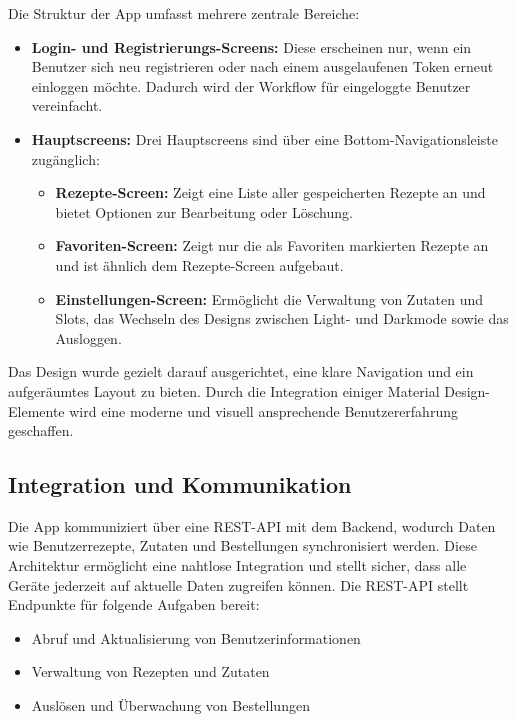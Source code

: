Die Struktur der App umfasst mehrere zentrale Bereiche:

\begin{itemize}
    \item \textbf{Login- und Registrierungs-Screens:} Diese erscheinen nur, wenn ein Benutzer sich 
        neu registrieren oder nach einem ausgelaufenen Token erneut einloggen möchte. Dadurch wird 
        der Workflow für eingeloggte Benutzer vereinfacht.
    \item \textbf{Hauptscreens:} Drei Hauptscreens sind über eine Bottom-Navigationsleiste 
        zugänglich:
    \begin{itemize}
        \item \textbf{Rezepte-Screen:} Zeigt eine Liste aller gespeicherten Rezepte an und bietet 
            Optionen zur Bearbeitung oder Löschung.
        \item \textbf{Favoriten-Screen:} Zeigt nur die als Favoriten markierten Rezepte an und ist 
            ähnlich dem Rezepte-Screen aufgebaut.
        \item \textbf{Einstellungen-Screen:} Ermöglicht die Verwaltung von Zutaten und Slots, das 
            Wechseln des Designs zwischen Light- und Darkmode sowie das Ausloggen.
    \end{itemize}
\end{itemize}

Das Design wurde gezielt darauf ausgerichtet, eine klare Navigation und ein aufgeräumtes Layout zu 
bieten. Durch die Integration einiger Material Design-Elemente wird eine moderne und visuell 
ansprechende Benutzererfahrung geschaffen.

\subsection{Integration und Kommunikation}
Die App kommuniziert über eine REST-API mit dem Backend, wodurch Daten wie Benutzerrezepte, 
Zutaten und Bestellungen synchronisiert werden. Diese Architektur ermöglicht eine nahtlose 
Integration und stellt sicher, dass alle Geräte jederzeit auf aktuelle Daten zugreifen können. Die 
REST-API stellt Endpunkte für folgende Aufgaben bereit:

\begin{itemize}
    \item Abruf und Aktualisierung von Benutzerinformationen
    \item Verwaltung von Rezepten und Zutaten
    \item Auslösen und Überwachung von Bestellungen
\end{itemize}

